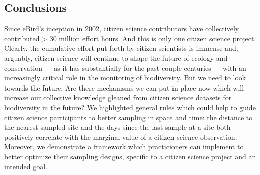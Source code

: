 \documentclass[9pt,twocolumn,twoside,lineno]{pnas-new}
\begin{document}
\subsection*{Conclusions}
Since eBird's inception in 2002, citizen science contributors have collectively contributed > 30 million effort hours. And this is only one citizen science project. Clearly, the cumulative effort put-forth by citizen scientists is immense and, arguably, citizen science will continue to shape the future of ecology and conservation --- as it has substantially for the past couple centuries \cite{silvertown2009new} --- with an increasingly critical role \cite{mckinley2017citizen, pocock2018vision} in the monitoring of biodiversity. But we need to look towards the future. Are there mechanisms we can put in place now which will increase our collective knowledge gleaned from citizen science datasets for biodiversity in the future? We highlighted general rules which could help to guide citizen science participants to better sampling in space and time: the distance to the nearest sampled site and the days since the last sample at a site both positively correlate with the marginal value of a citizen science observation. Moreover, we demonstrate a framework which practicioners can implement to better optimize their sampling designs, specific to a citizen science project and an intended goal.
\end{document}
